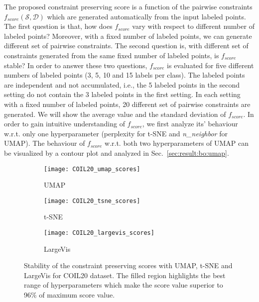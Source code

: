 The proposed constraint preserving score is a function of the pairwise constraints $f_{score}(\mathcal{S}, \mathcal{D})$ which are generated automatically from the input labeled points.
The first question is that, how does $f_{score}$ vary with respect to different number of labeled points?
Moreover, with a fixed number of labeled points, we can generate different set of pairwise constraints.
The second question is, with different set of constraints generated from the same fixed number of labeled points, is $f_{score}$ stable?
In order to answer these two questions, $f_{score}$ is evaluated for five different numbers of labeled points (3, 5, 10 and 15 labels per class).
The labeled points are independent and not accumulated, i.e., the 5 labeled points in the second setting do not contain the 3 labeled points in the first setting.
In each setting with a fixed number of labeled points, 20 different set of pairwise constraints are generated.
We will show the average value and the standard deviation of $f_{score}$.
In order to gain intuitive understanding of $f_{score}$, we first analyze its' behaviour w.r.t. only one hyperparameter (perplexity for t-SNE and \emph{n\_neighbor} for UMAP).
The behaviour of $f_{score}$ w.r.t. both two hyperparameters of UMAP can be visualized by a contour plot and analyzed in Sec.~\ref{sec:result:bo:umap}. %

\begin{figure}%
\begin{subfigure}[b]{0.32\linewidth}
     \centering
     \texttt{[image: COIL20\_umap\_scores]}
     \caption{UMAP}
\end{subfigure}
\hfill
\begin{subfigure}[b]{0.32\linewidth}
     \centering
     \texttt{[image: COIL20\_tsne\_scores]}
     \caption{t-SNE}
\end{subfigure}
\hfill
\begin{subfigure}[b]{0.32\linewidth}
     \centering
     \texttt{[image: COIL20\_largevis\_scores]}
     \caption{LargeVis}
\end{subfigure}
\caption{Stability of the constraint preserving scores with UMAP, t-SNE and LargeVis for COIL20 dataset.
The filled region highlights the best range of hyperparameters which make the score value superior to 96\% of maximum score value.}
\label{fig:score:stability:COIL20}
\end{figure}

